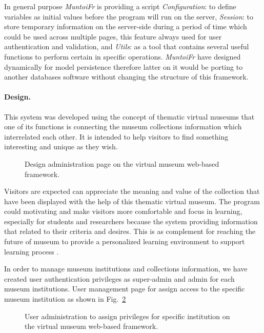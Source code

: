 In general purpose \textit{MuntoiFr} is providing a script \textit{Configuration}: to define variables as initial values before the program will run on the server, \textit{Session}: to store temporary information on the server-side during a period of time which could be used across multiple pages, this feature always used for user authentication and validation, and \textit{Utils}: as a tool that contains several useful functions to perform certain in specific operations. \textit{MuntoiFr} have designed dynamically for model persistence therefore latter on it would be porting to another databases software without changing the structure of this framework.

\paragraph{Design.} This system was developed using the concept of thematic virtual museums that one of its functions is connecting the museum collections information which interrelated each other. It is intended to help visitors to find something interesting and unique as they wish.

\begin{figure}[ht]
	\caption{Design administration page on the virtual museum web-based framework.}\label{fig:designAdminPage}
\end{figure}

Visitors are expected can appreciate the meaning and value of the collection that have been displayed with the help of this thematic virtual museum. The program could motivating and make visitors more comfortable and focus in learning, especially for students and researchers because the system providing information that related to their criteria and desires. This is as complement for reaching the future of museum to provide a personalized learning environment to support learning process \cite{Anggai}.

In order to manage museum institutions and collections information, we have created user authentication privileges as super-admin and admin for each museum institutions. User management page for assign access to the specific museum institution as shown in Fig.~\cref{fig:userAdminPage}

\begin{figure}[ht]
	\caption{User administration to assign privileges for specific institution on the virtual museum web-based framework.}\label{fig:userAdminPage}
\end{figure}

